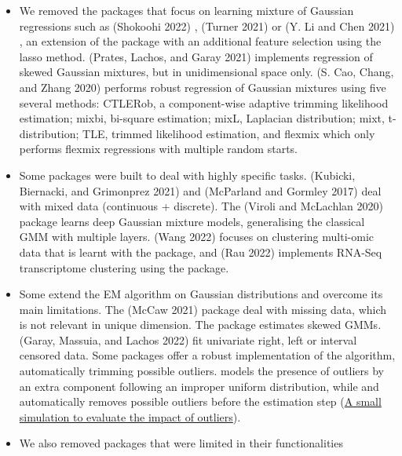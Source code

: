 \begin{itemize}
\item
  We removed the packages that focus on learning mixture of Gaussian
  regressions such as  (Shokoohi 2022) , 
  (Turner 2021) or  (Y. Li and Chen 2021) , an extension of
  the  package with an additional feature selection
  using the lasso method.  (Prates, Lachos, and Garay 2021) implements
  regression of skewed Gaussian mixtures, but in unidimensional space
  only.  (S. Cao, Chang, and Zhang 2020) performs robust regression
  of Gaussian mixtures using five several methods: CTLERob, a
  component-wise adaptive trimming likelihood estimation; mixbi,
  bi-square estimation; mixL, Laplacian distribution; mixt,
  t-distribution; TLE, trimmed likelihood estimation, and flexmix
  which only performs flexmix regressions with multiple random starts.
\item
  Some packages were built to deal with highly specific tasks.
   (Kubicki, Biernacki, and Grimonprez 2021) and 
  (McParland and Gormley 2017) deal with mixed data (continuous + discrete). The
   (Viroli and McLachlan 2020) package learns deep Gaussian mixture
  models, generalising the classical GMM with multiple layers.
   (Wang 2022) focuses on clustering multi-omic data that
  is learnt with the  package, and 
  (Rau 2022) implements RNA-Seq transcriptome clustering using the
   package.
\item
  Some extend the EM algorithm on Gaussian distributions and overcome
  its main limitations. The  (McCaw 2021) package deal with
  missing data, which is not relevant in unique dimension. The
   package estimates skewed GMMs. 
  (Garay, Massuia, and Lachos 2022) fit univariate right, left or interval censored
  data. Some packages offer a robust implementation of the algorithm,
  automatically trimming possible outliers.  models the
  presence of outliers by an extra component following an improper
  uniform distribution, while  and 
  automatically removes possible outliers before the estimation step
  (\protect\hyperlink{a-small-simulation-to-evaluate-the-impact-of-outliers}{A small simulation to evaluate the impact of outliers}).
\item
  We also removed packages that were limited in their functionalities

\end{itemize}
